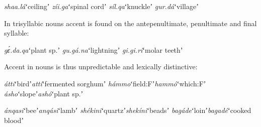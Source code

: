 \documentclass[output=paper]{LSP/langsci}
\begin{document}
\begin{exe}
	\ex \label{ex:Petrollino:lexicalstress} \begin{xlist}
	\ex \textit{shaa.lá}\hspace{7mm}ʻceilingʼ
    \ex \textit{zíi.ga}\hspace{10mm}ʻspinal cordʼ
    \ex \textit{síl.qa}\hspace{10mm}ʻknuckleʼ
    \ex \textit{gur.dá}\hspace{9mm}ʻvillageʼ
    \end{xlist}
\end{exe}
In trisyllabic nouns accent is found on the antepenultimate, penultimate and final syllable:

\begin{exe}
	\ex \begin{xlist}
	\ex \textit{gɛ́.da.qa}\hspace{4mm}ʻplant sp.ʼ
    \ex \textit{gu.gá.na}\hspace{4mm}ʻlightningʼ
    \ex \textit{gi.gi.rí}\hspace{7mm}ʻmolar teethʼ
    \end{xlist}
\end{exe}
Accent in nouns is thus unpredictable and lexically distinctive: 

\begin{exe}
	\ex \begin{xlist}
	\ex \textit{átti}\hspace{12mm}ʻbirdʼ\hspace{10mm}\textit{attí}\hspace{10mm}ʻfermented sorghumʼ
    \ex \textit{hámmo}\hspace{6mm}ʻfield:Fʼ\hspace{6mm}\textit{hammó}\hspace{5mm}ʻwhich:Fʼ
    \ex \textit{ásho}\hspace{11mm}ʻslopeʼ\hspace{8mm}\textit{ashó}\hspace{9mm}ʻplant sp.ʼ
\end{xlist} \label{ex:Petrollino:minimalpairs1}
\end{exe}

\begin{exe}
	\ex \begin{xlist}
	\ex \textit{ánqasi}\hspace{8mm}ʻbeeʼ\hspace{11mm}\textit{anqási}\hspace{6mm}ʻlambʼ
    \ex \textit{shékini}\hspace{8mm}ʻquartzʼ\hspace{6mm}\textit{shekíni}\hspace{5mm}ʻbeadsʼ
    \ex \textit{bagáde}\hspace{8mm}ʻloinʼ\hspace{10mm}\textit{bagadé}\hspace{5mm}ʻcooked bloodʼ
\end{xlist} \label{ex:Petrollino:minimalpairs2}
\end{exe}
\end{document}
